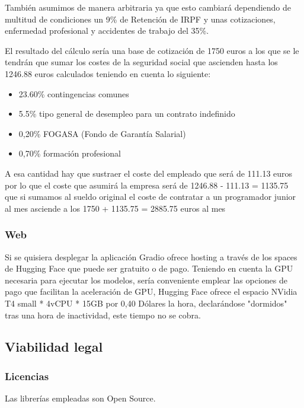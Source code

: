 También asumimos de manera arbitraria ya que esto cambiará dependiendo de multitud de condiciones un 9\% de Retención de IRPF y unas cotizaciones, enfermedad profesional y accidentes de trabajo del 35\%.

El resultado del cálculo sería una base de cotización de 1750 euros a los que se le tendrán que sumar los costes de la seguridad social que ascienden hasta los 1246.88 euros calculados teniendo en cuenta lo siguiente:

\begin{itemize}

    \item 23.60\% contingencias comunes
    \item 5.5\% tipo general de desempleo para un contrato indefinido
    \item 0,20\% FOGASA (Fondo de Garantía Salarial)
    \item 0,70\% formación profesional

\end{itemize}

A esa cantidad hay que sustraer el coste del empleado que será de 111.13 euros por lo que el coste que asumirá la empresa será de 1246.88 - 111.13 = 1135.75 que si sumamos al sueldo original el coste de contratar a un programador junior al mes asciende a los 1750 + 1135.75 = 2885.75 euros al mes 

\subsubsection{Web}

Si se quisiera desplegar la aplicación Gradio ofrece hosting a través de los spaces de Hugging Face que puede ser gratuito o de pago. Teniendo en cuenta la GPU necesaria para ejecutar los modelos, sería conveniente emplear las opciones de pago que facilitan la aceleración de GPU, Hugging Face ofrece el espacio NVidia T4 small * 4vCPU * 15GB por 0,40 Dólares la hora, declarándose "dormidos" tras una hora de inactividad, este tiempo no se cobra.

\subsection{Viabilidad legal}
\subsubsection{Licencias}
Las librerías empleadas son Open Source.

